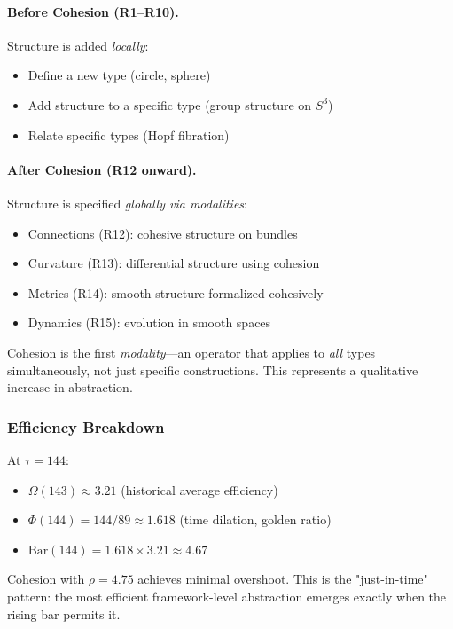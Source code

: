 \documentclass[11pt]{article}
\theoremstyle{definition}
\begin{document}
\paragraph{Before Cohesion (R1--R10).}
Structure is added \emph{locally}:
\begin{itemize}
\item Define a new type (circle, sphere)
\item Add structure to a specific type (group structure on $S^3$)
\item Relate specific types (Hopf fibration)
\end{itemize}

\paragraph{After Cohesion (R12 onward).}
Structure is specified \emph{globally via modalities}:
\begin{itemize}
\item Connections (R12): cohesive structure on bundles
\item Curvature (R13): differential structure using cohesion
\item Metrics (R14): smooth structure formalized cohesively
\item Dynamics (R15): evolution in smooth spaces
\end{itemize}

Cohesion is the first \emph{modality}—an operator that applies to \emph{all} types simultaneously, not just specific constructions. This represents a qualitative increase in abstraction.

\subsubsection{Efficiency Breakdown}

At $\tau=144$:
\begin{itemize}
\item $\Omega(143) \approx 3.21$ (historical average efficiency)
\item $\Phi(144) = 144/89 \approx 1.618$ (time dilation, golden ratio)
\item $\text{Bar}(144) = 1.618 \times 3.21 \approx 4.67$
\end{itemize}

Cohesion with $\rho=4.75$ achieves minimal overshoot. This is the "just-in-time" pattern: the most efficient framework-level abstraction emerges exactly when the rising bar permits it.
\end{document}
